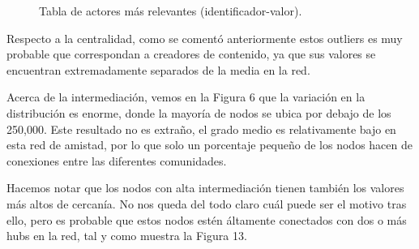 \begin{figure}[H]
    \centering
    \caption{Tabla de actores más relevantes (identificador-valor).}
\end{figure}

Respecto a la centralidad, como se comentó anteriormente estos outliers es muy probable que correspondan a creadores de contenido, ya que sus valores se encuentran extremadamente separados de la media en la red.

Acerca de la intermediación, vemos en la Figura 6 que la variación en la distribución es enorme, donde la mayoría de nodos se ubica por debajo de los 250,000. Este resultado no es extraño, el grado medio es relativamente bajo en esta red de amistad, por lo que solo un porcentaje pequeño de los nodos hacen de conexiones entre las diferentes comunidades.

\vspace{\baselineskip}

Hacemos notar que los nodos con alta intermediación tienen también los valores más altos de cercanía. No nos queda del todo claro cuál puede ser el motivo tras ello, pero es probable que estos nodos estén áltamente conectados con dos o más hubs en la red, tal y como muestra la  Figura 13.

\vspace{\baselineskip}

